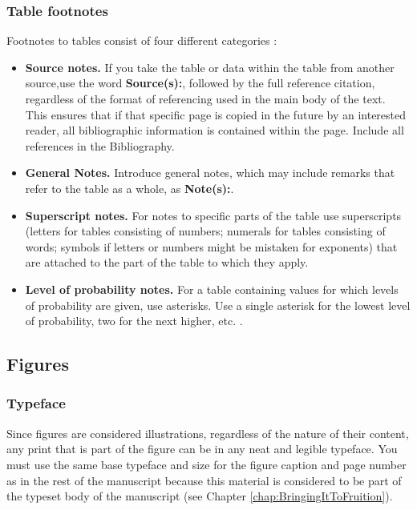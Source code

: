 \subsubsection{Table footnotes}
\label{sec:TableFootnotes}

Footnotes to tables consist of four different categories
\cite{turabian1987}:
\begin{itemize}
\item \textbf{Source notes.} If you take the table or data within the
  table from another source,use the word \textbf{Source(s):}, followed
  by the full reference citation, regardless of the format of
  referencing used in the main body of the text. This ensures that if
  that specific page is copied in the future by an interested reader,
  all bibliographic information is contained within the page. Include
  all references in the Bibliography.
\item \textbf{General Notes.} Introduce general notes, which may
  include remarks that refer to the table as a whole, as
  \textbf{Note(s):}.
\item \textbf{Superscript notes.} For notes to specific parts of the
  table use superscripts (letters for tables consisting of numbers;
  numerals for tables consisting of words; symbols if letters or
  numbers might be mistaken for exponents) that are attached to the
  part of the table to which they apply.
\item \textbf{Level of probability notes.} For a table containing
  values for which levels of probability are given, use asterisks. Use
  a single asterisk for the lowest level of probability, two for the
  next higher, etc. \cite{chicago1982}.
\end{itemize}

\subsection{Figures}
\label{sec:Figures}

\subsubsection{Typeface}
\label{sec:FigureTypeface}

Since figures are considered illustrations, regardless of the nature
of their content, any print that is part of the figure can be in any
neat and legible typeface. You must use the same base typeface and
size for the figure caption and page number as in the rest of the
manuscript because this material is considered to be part of the
typeset body of the manuscript (see Chapter
\ref{chap:BringingItToFruition}).

